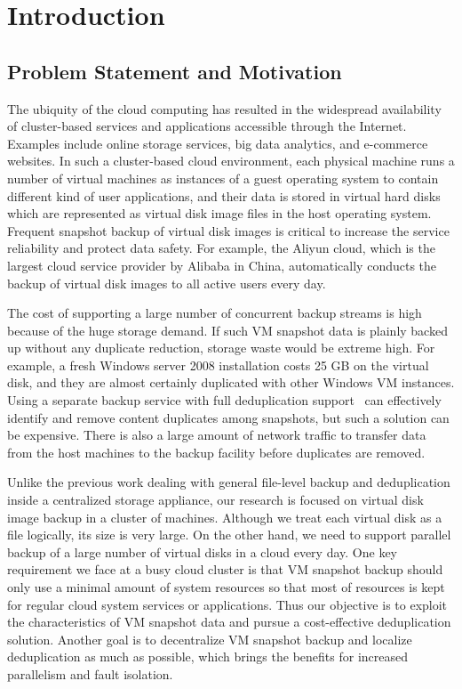 \chapter{Introduction}
\label{chap:intro}
\section{Problem Statement and Motivation}
\label{intro:prob}
The ubiquity of the cloud computing has resulted in the 
widespread availability of cluster-based services and applications accessible through
the Internet. Examples include online storage services, big data analytics, and e-commerce websites.
In such a cluster-based cloud environment,
each physical machine runs a number of virtual machines as  instances of a guest operating system
to contain different kind of user applications,
and their data is stored in virtual hard disks which are represented
as virtual disk image files in the host operating system.
Frequent snapshot backup of virtual disk images is critical to increase  the service reliability
and protect data safety.
For example, the Aliyun cloud, which is  the largest cloud service provider by Alibaba in China,
automatically conducts  the backup of virtual disk images to all active users every day.

The cost of supporting a large number of concurrent backup streams is high
because of the huge storage demand.
If such VM snapshot data is plainly backed up without any duplicate reduction, storage waste would be
extreme high. For example, a fresh Windows server 2008 installation costs 25 GB on the virtual disk,
and they are almost certainly duplicated with other Windows VM instances\cite{common07, pedal96}.
Using a separate  backup service with full deduplication support~\cite{venti02,bottleneck08}
can effectively identify and remove content duplicates among snapshots,
but such a solution can be expensive. There is also a large amount of
network traffic to transfer  data from the host machines to the backup facility
before duplicates are removed.

Unlike the previous work dealing with general file-level
backup and deduplication inside a centralized storage appliance, our research is focused on virtual
disk image backup in a cluster of machines. Although we treat each virtual disk as a
file logically, its size is very large. On the other hand, we need
to support parallel backup of a large number of virtual disks
in a cloud every day. One key requirement we face at a busy cloud cluster
 is that VM snapshot backup should only use a minimal
amount of system resources so that most of resources is kept
for regular cloud system services or applications. Thus our
objective is to exploit the characteristics of VM snapshot data
and pursue a cost-effective deduplication solution. Another
goal is to decentralize VM snapshot backup and localize
deduplication as much as possible, which brings the benefits
for increased parallelism and fault isolation.

